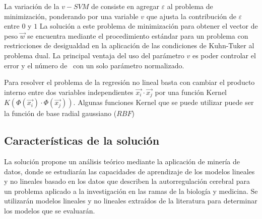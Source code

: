 La variación de la $v-SVM$ de \cite{Scholkopf2000} consiste en agregar $\varepsilon$ al problema de minimización, ponderando por una variable $v$ que ajusta la contribución de $\varepsilon$ entre $0$ y $1$
La solución a este problema de minimización para obtener el vector de peso $\vec{w}$ se encuentra mediante el procedimiento estándar para un problema con restricciones de desigualdad en la aplicación de las condiciones de Kuhn-Tuker al problema dual. La principal ventaja del uso del parámetro $v$ es poder controlar el error y el número de \sv\, con un solo parámetro normalizado.

Para resolver el problema de la regresión no lineal basta con cambiar el producto interno entre dos variables independientes $\vec{x_i}\cdot\vec{x_j}$ por una función Kernel $K(\Phi(\vec{x_i})\cdot\Phi(\vec{x_j}))$. Algunas funciones Kernel que se puede utilizar puede ser la función de base radial gaussiano ($RBF$)

\subsection{Características de la solución}
La solución propone un análisis teórico mediante la aplicación de minería de datos, donde se estudiarán las capacidades de aprendizaje de los modelos lineales y no lineales basado en los datos que describen la autorregulación cerebral para un problema aplicado a la investigación en las ramas de la biología y medicina. Se utilizarán modelos lineales y no lineales extraídos de la literatura para determinar los modelos que se evaluarán.

